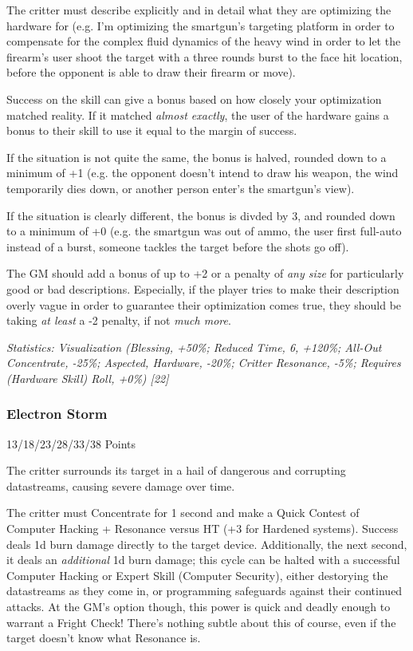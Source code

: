\begin{multicols*}{3}
	The critter must describe explicitly and in detail what they are optimizing the hardware for (e.g. I'm optimizing the smartgun's targeting platform in order to compensate for the complex fluid dynamics of the heavy wind in order to let the firearm's user shoot the target with a three rounds burst to the face hit location, before the opponent is able to draw their firearm or move). 
	
	Success on the skill can give a bonus based on how closely your optimization matched reality. If it matched \textit{almost exactly}, the user of the hardware gains a bonus to their skill to use it equal to the margin of success. 
	
	If the situation is not quite the same, the bonus is halved, rounded down to a minimum of +1 (e.g. the opponent doesn't intend to draw his weapon, the wind temporarily dies down, or another person enter's the smartgun's view). 
	
	If the situation is clearly different, the bonus is divded by 3, and rounded down to a minimum of +0 (e.g. the smartgun was out of ammo, the user first full-auto instead of a burst, someone tackles the target before the shots go off).
	
	The GM should add a bonus of up to +2 or a penalty of \textit{any size} for particularly good or bad descriptions. Especially, if the player tries to make their description overly vague in order to guarantee their optimization comes true, they should be taking \textit{at least} a -2 penalty, if not \textit{much more}.

	\textcolor{OliveGreen}{\textit{Statistics: Visualization (Blessing, +50\%; Reduced Time, 6, +120\%; All-Out Concentrate, -25\%; Aspected, Hardware, -20\%; Critter Resonance, -5\%; Requires (Hardware Skill) Roll, +0\%) [22] }}

	\subsubsection{Electron Storm}\label{electron_storm}
	\begin{flushright}
		13/18/23/28/33/38 Points
	\end{flushright}

	The critter surrounds its target in a hail of dangerous and corrupting datastreams, causing severe damage over time.
	
	The critter must Concentrate for 1 second and make a Quick Contest of Computer Hacking + Resonance versus HT (+3 for Hardened systems). Success deals 1d burn damage directly to the target device. Additionally, the next second, it deals an \textit{additional} 1d burn damage; this cycle can be halted with a successful Computer Hacking or Expert Skill (Computer Security), either destorying the datastreams as they come in, or programming safeguards against their continued attacks. At the GM's option though, this power is quick and deadly enough to warrant a Fright Check! There's nothing subtle about this of course, even if the target doesn't know what Resonance is.
	

\end{multicols*}
